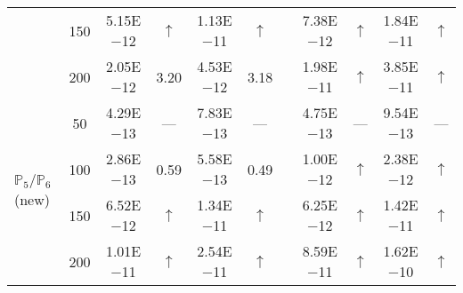 \begin{table}[H]
{\begin{tabular}{@{}l c c c c c c c c c c@{}}
 & 150 & 5.15E$-$12 & $\uparrow$  & 1.13E$-$11 & $\uparrow$ &  & 7.38E$-$12 & $\uparrow$ & 1.84E$-$11 & $\uparrow$\\
 & 200 & 2.05E$-$12 & 3.20  & 4.53E$-$12 & 3.18 &  & 1.98E$-$11 & $\uparrow$ & 3.85E$-$11 & $\uparrow$\\
\midrule
\multirow{4}{*}{$\mathbb{P}_{5}/\mathbb{P}_{6}$ (new)}
 & 50 & 4.29E$-$13 & ---  & 7.83E$-$13 & --- &  & 4.75E$-$13 & --- & 9.54E$-$13 & ---\\
 & 100 & 2.86E$-$13 & 0.59  & 5.58E$-$13 & 0.49 &  & 1.00E$-$12 & $\uparrow$ & 2.38E$-$12 & $\uparrow$\\
 & 150 & 6.52E$-$12 & $\uparrow$  & 1.34E$-$11 & $\uparrow$ &  & 6.25E$-$12 & $\uparrow$ & 1.42E$-$11 & $\uparrow$\\
 & 200 & 1.01E$-$11 & $\uparrow$  & 2.54E$-$11 & $\uparrow$ &  & 8.59E$-$11 & $\uparrow$ & 1.62E$-$10 & $\uparrow$\\
\bottomrule
\end{tabular}}
\label{none}
\end{table}
